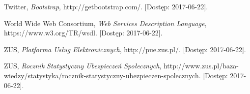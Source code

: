 \documentclass[licencjacka]{pracamgr}
\begin{document}
\begin{thebibliography}{99}
 Twitter, \textit{Bootstrap},
http://getbootstrap.com/. [Dostęp: 2017-06-22].

 World Wide Web Consortium, \textit{Web Services Description Language},
https://www.w3.org/TR/wsdl. [Dostęp: 2017-06-22].

 ZUS, \textit{Platforma Usług Elektronicznych},
http://pue.zus.pl/. [Dostęp: 2017-06-22].

 ZUS, \textit{Rocznik Statystyczny Ubezpieczeń Społecznych},
http://www.zus.pl/baza-wiedzy/statystyka/rocznik-statystyczny-ubezpieczen-spolecznych. [Dostęp: 2017-06-22].

\end{thebibliography}
\end{document}
